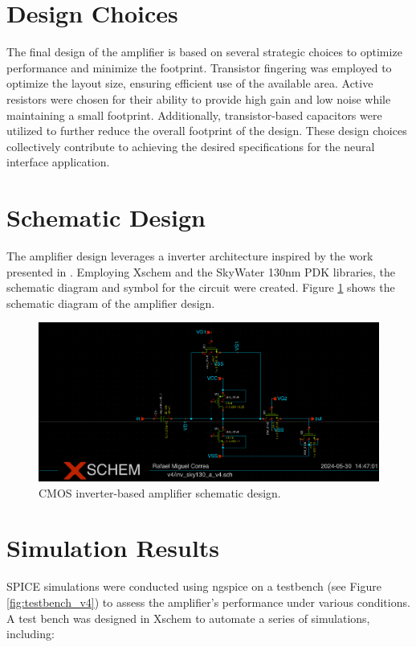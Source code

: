 \section{Design Choices}
The final design of the amplifier is based on several strategic choices to optimize performance and minimize the footprint. 
Transistor fingering was employed to optimize the layout size, ensuring efficient use of the available area. 
Active resistors were chosen for their ability to provide high gain and low noise while maintaining a small footprint. 
Additionally, transistor-based capacitors were utilized to further reduce the overall footprint of the design. 
These design choices collectively contribute to achieving the desired specifications for the neural interface application.

\section{Schematic Design}
The amplifier design leverages a inverter architecture inspired by the work presented in \textcite{Yuan_Hierlemann_Frey_2021}.
Employing Xschem and the SkyWater 130nm PDK libraries, the schematic diagram and symbol for the circuit were created. 
Figure \ref{fig:schematic_v4} shows the schematic diagram of the amplifier design.

\begin{figure}[ht!]
\centering
\includegraphics[width=\textwidth]{Figures/v4_schematic.png}
\caption{CMOS inverter-based amplifier schematic design.}
\label{fig:schematic_v4}
\end{figure}

\section{Simulation Results}

SPICE simulations were conducted using ngspice on a testbench (see Figure \ref{fig:testbench_v4}) to assess the amplifier's performance under various conditions. 
A test bench was designed in Xschem to automate a series of simulations, including:

